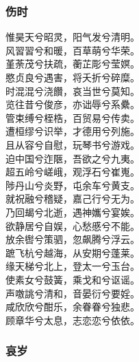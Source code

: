 \documentclass[]{article}
\begin{document}
\hypertarget{header-n3161}{%
\subsubsection{伤时}\label{header-n3161}}

惟昊天兮昭灵，阳气发兮清明。\\
风習習兮和暖，百草萌兮华荣。\\
堇荼茂兮扶疏，蘅芷彫兮莹嫇。\\
愍贞良兮遇害，将夭折兮碎糜。\\
时混混兮浇饡，哀当世兮莫知。\\
览往昔兮俊彦，亦诎辱兮系纍。\\
管束缚兮桎梏，百贸易兮传卖。\\
遭桓缪兮识举，才德用兮列施。\\
且从容兮自慰，玩琴书兮游戏。\\
迫中国兮迮陿，吾欲之兮九夷。\\
超五岭兮嵯峨，观浮石兮崔嵬。\\
陟丹山兮炎野，屯余车兮黄支。\\
就祝融兮稽疑，嘉己行兮无为。\\
乃回朅兮北逝，遇神孈兮宴娭。\\
欲静居兮自娱，心愁慼兮不能。\\
放余辔兮策驷，忽飙腾兮浮云。\\
蹠飞杭兮越海，从安期兮蓬莱。\\
缘天梯兮北上，登太一兮玉台。\\
使素女兮鼓簧，乘戈和兮讴谣。\\
声噭誂兮清和，音晏衍兮要婬。\\
咸欣欣兮酣乐，余眷眷兮独悲。\\
顾章华兮太息，志恋恋兮依依。

\hypertarget{header-n3166}{%
\subsubsection{哀岁}\label{header-n3166}}
\end{document}
